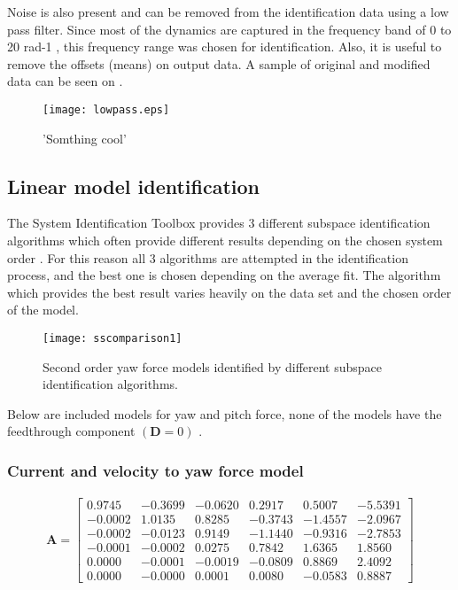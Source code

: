 
Noise is also present and can be removed from the identification data using a low pass filter.
Since most of the dynamics are captured in the frequency band of 0 to 20 rad-1 , this frequency range was chosen for identification.
Also, it is useful to remove the offsets (means) on output data.
A sample of original and modified data can be seen on .
%
\begin{figure}[H]
\centering
\texttt{[image: lowpass.eps]}
\caption{'Somthing cool'}
\label{figlowpass}
\end{figure}

\subsection{Linear model identification}

The System Identification Toolbox provides 3 different subspace identification algorithms which often provide different results depending on the chosen system order \cite{van1994n4sid}. 
For this reason all 3 algorithms are attempted in the identification process, and the best one is chosen depending on the average fit.
The algorithm which provides the best result varies heavily on the data set and the chosen order of the model.

\begin{figure}[H]
\centering
\hspace{-2em}\texttt{[image: sscomparison1]}
\caption{Second order yaw force models identified by different subspace identification algorithms.}
\label{fig:1LMI}
\end{figure}

Below are included models for yaw and pitch force, none of the models have the feedthrough component  $\left( \mathbf{D} = 0 \right)$ .
\subsubsection{Current and velocity to yaw force model}

\begin{align}
\mathbf{A} = \begin{bmatrix}
    0.9745 &  -0.3699 & -0.0620 &   0.2917 &   0.5007 &  -5.5391 \\
   -0.0002 &   1.0135 &  0.8285 &  -0.3743 &  -1.4557 &  -2.0967 \\
   -0.0002 &  -0.0123 &  0.9149 &  -1.1440 &  -0.9316 &  -2.7853 \\
   -0.0001 &  -0.0002 &  0.0275 &   0.7842 &   1.6365 &   1.8560 \\
    0.0000 &  -0.0001 & -0.0019 &  -0.0809 &   0.8869 &   2.4092 \\
    0.0000 &  -0.0000 &  0.0001 &   0.0080 &  -0.0583 &   0.8887 
     \end{bmatrix}
\end{align}

